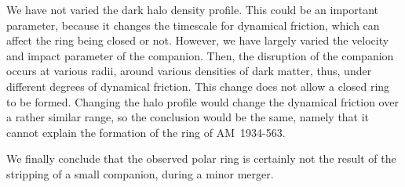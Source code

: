 \documentclass[]{aa}
\begin{document}
We have not varied the dark halo density profile. This could be an important parameter, 
because it changes the timescale for dynamical friction, which can affect the ring being 
closed or not. However, we have largely varied the velocity and impact parameter of the 
companion. Then, the disruption of the companion occurs at various radii, around 
various densities of dark matter, thus, under different degrees of dynamical friction. 
This change does not allow a closed ring to be formed. Changing the halo profile 
would change the dynamical friction over a rather similar range, so the conclusion 
would be the same, namely that it cannot explain the formation of the ring of AM~1934-563.

We finally conclude that the observed polar ring is certainly not the result of the 
stripping of a small companion, during a minor merger.
\end{document}
